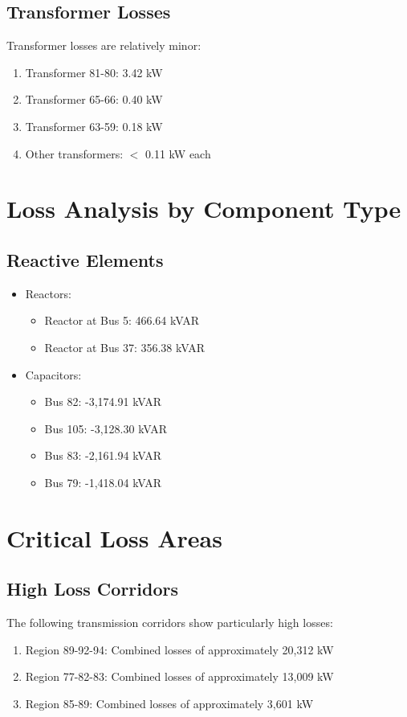 \documentclass[11pt]{article}
\begin{document}
\subsection{Transformer Losses}
Transformer losses are relatively minor:
\begin{enumerate}
    \item Transformer 81-80: 3.42 kW
    \item Transformer 65-66: 0.40 kW
    \item Transformer 63-59: 0.18 kW
    \item Other transformers: $<$ 0.11 kW each
\end{enumerate}

\section{Loss Analysis by Component Type}

\subsection{Reactive Elements}
\begin{itemize}
    \item Reactors:
    \begin{itemize}
        \item Reactor at Bus 5: 466.64 kVAR
        \item Reactor at Bus 37: 356.38 kVAR
    \end{itemize}
    \item Capacitors:
    \begin{itemize}
        \item Bus 82: -3,174.91 kVAR
        \item Bus 105: -3,128.30 kVAR
        \item Bus 83: -2,161.94 kVAR
        \item Bus 79: -1,418.04 kVAR
    \end{itemize}
\end{itemize}

\section{Critical Loss Areas}

\subsection{High Loss Corridors}
The following transmission corridors show particularly high losses:
\begin{enumerate}
    \item Region 89-92-94: Combined losses of approximately 20,312 kW
    \item Region 77-82-83: Combined losses of approximately 13,009 kW
    \item Region 85-89: Combined losses of approximately 3,601 kW
\end{enumerate}
\end{document}
